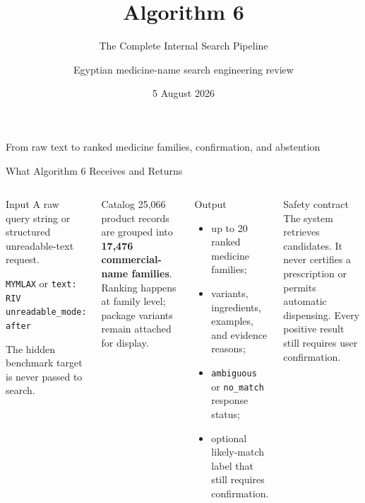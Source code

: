 \documentclass[aspectratio=169,10pt]{beamer}
\title{Algorithm 6}
\subtitle{The Complete Internal Search Pipeline}
\author{Egyptian medicine-name search engineering review}
\date{5 August 2026}
\newcommand{\code}[1]{\texttt{#1}}
\begin{document}
\begin{frame}[plain]
  \titlepage
  \vspace{-4mm}
  \begin{center}
    \small From raw text to ranked medicine families, confirmation, and abstention
  \end{center}
\end{frame}

\begin{frame}{What Algorithm 6 Receives and Returns}
\begin{columns}[T,onlytextwidth]
\begin{block}{Input}
\small
A raw query string or structured unreadable-text request.
\begin{center}
\code{MYMLAX}
\quad or \quad
\code{text: RIV}\\[-1mm]
\code{unreadable\_mode: after}
\end{center}
The hidden benchmark target is never passed to search.
\end{block}

\begin{block}{Catalog}
\small
25,066 product records are grouped into \textbf{17,476 commercial-name
families}. Ranking happens at family level; package variants remain attached
for display.
\end{block}

\begin{block}{Output}
\small
\begin{itemize}
  \item up to 20 ranked medicine families;
  \item variants, ingredients, examples, and evidence reasons;
  \item \code{ambiguous} or \code{no\_match} response status;
  \item optional likely-match label that still requires confirmation.
\end{itemize}
\end{block}

\begin{alertblock}{Safety contract}
\small
The system retrieves candidates. It never certifies a prescription or permits
automatic dispensing. Every positive result still requires user confirmation.
\end{alertblock}
\end{columns}
\end{frame}
\end{document}
